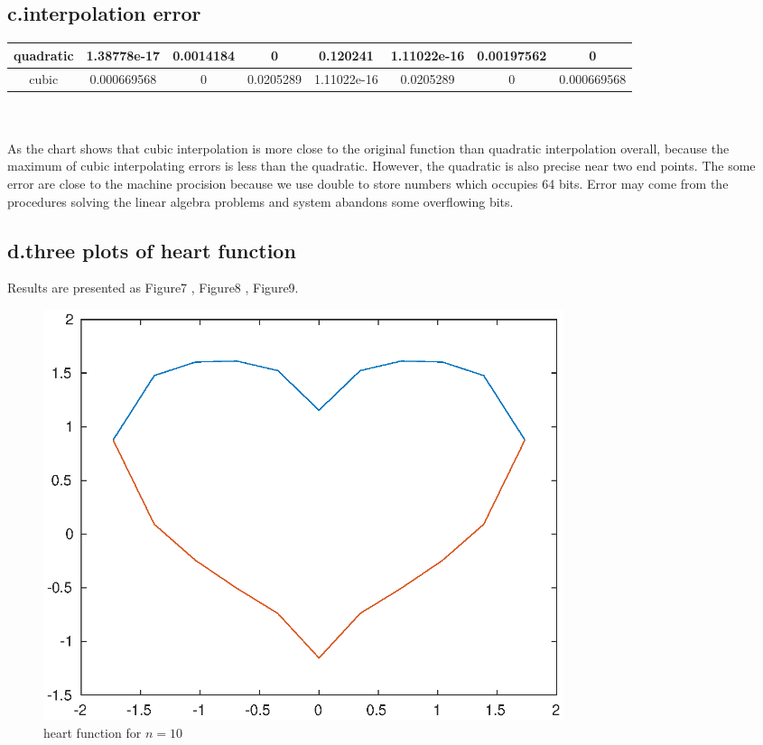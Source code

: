\documentclass[twoside,a4paper]{article}
\begin{document}
\subsection*{c.interpolation error}
\begin{tabular}{c|ccccccc}
quadratic&1.38778e-17 &0.0014184 &0 &0.120241 &1.11022e-16 &0.00197562 &0 \\
\hline
cubic &0.000669568 &0 &0.0205289 &1.11022e-16 &0.0205289 &0 &0.000669568 \\
\end{tabular}
\\
\\
As the chart shows that cubic interpolation is more close to the original function than quadratic interpolation overall, because the maximum of cubic interpolating errors is less than the quadratic. However, the quadratic is also precise near two end points. The some error are close to the machine procision because we use double to store numbers which occupies 64 bits. Error may come from the procedures solving the linear algebra problems and system abandons some overflowing bits. 

\subsection*{d.three plots of heart function}
Results are presented as Figure7 , Figure8 , Figure9.
\begin{figure}[h]
\includegraphics[width=6in]{./figure/n10.eps}
\caption{heart function for $n=10$}
\end{figure}
\end{document}
